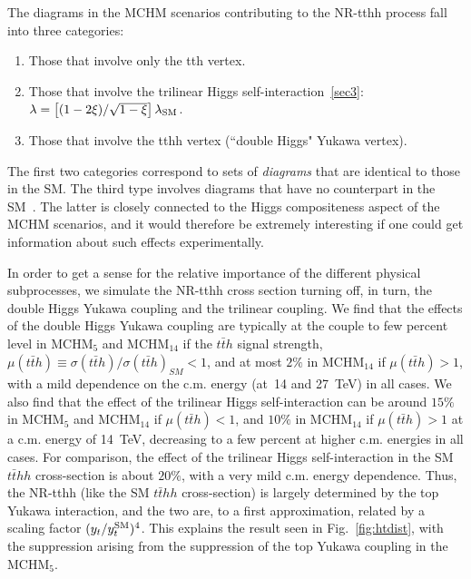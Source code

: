 \label{NRtth}
The diagrams in the MCHM scenarios contributing to the NR-tthh process
fall into three categories:
%
\begin{enumerate}
\item Those that involve only the tth vertex.
\item Those that involve the trilinear Higgs self-interaction~\ref{sec3}:
$\lambda = \left[ (1 - 2 \xi)/\sqrt{1 - \xi} \right] \lambda_{\rm
SM}$.
\item Those that involve the tthh vertex (``double Higgs" Yukawa vertex).
\end{enumerate}
%
The first two categories correspond to sets of \textit{diagrams} that
are identical to those in the SM. The third type involves diagrams
that have no counterpart in the SM~\cite{Contino:2012xk}.  The latter
is closely connected to the Higgs compositeness aspect of the MCHM
scenarios, and it would therefore be extremely interesting if one
could get information about such effects experimentally.

In order to get a sense for the relative importance of the different
physical subprocesses, we simulate the NR-tthh cross section
turning off, in turn, the double Higgs Yukawa coupling and the trilinear
coupling.  We find that the effects of the double Higgs Yukawa coupling are
typically at the couple to few percent level in MCHM$_5$ and MCHM$_{14}$ if the $t\bar{t}h$ signal strength,
$\mu(t\bar{t}h) \equiv \sigma(t\bar{t}h)/{\sigma(t\bar{t}h)}_{SM} < 1$, 
and at most $2\%$ in MCHM$_{14}$ if $\mu(t\bar{t}h) > 1$, with a mild dependence
on the c.m. energy (at~14 and 27~TeV) in all cases.
We also find that the effect of the trilinear Higgs self-interaction
can be around $15\%$ in MCHM$_5$ and MCHM$_{14}$ if $\mu(t\bar{t}h) < 1$, and $10\%$ in MCHM$_{14}$ if $\mu(t\bar{t}h) > 1$ at a c.m. energy of 14~TeV, decreasing to a few
percent at higher c.m. energies in all cases.  For comparison, the effect of the
trilinear Higgs self-interaction in the SM $t\bar{t}hh$ cross-section
is about $20\%$, with a very mild c.m. energy dependence.  Thus, the
NR-tthh (like the SM $t\bar{t}hh$ cross-section) is largely determined
by the top Yukawa interaction, and the two are, to a first
approximation, related by a scaling factor $(y_t / y_t^ {\rm SM})^4$.
This explains the result seen in Fig.~\ref{fig:htdist}, with the
suppression arising from the suppression of the top Yukawa coupling in
the MCHM$_5$.


